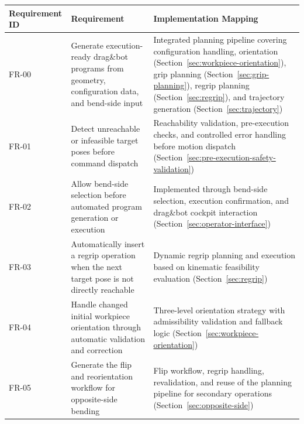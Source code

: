 ﻿\begin{landscape}

\begin{table}[p]
\centering
\normalsize
\setlength{\tabcolsep}{3pt}
\renewcommand{\arraystretch}{1.08}

\begin{tabular}{
L{3.0cm}
L{6.8cm}
L{12.2cm}
}
\hline
\textbf{Requirement ID} &
\textbf{Requirement} &
\textbf{Implementation Mapping} \\
\hline

FR-00 & Generate execution-ready drag\&bot programs from geometry, configuration data, and bend-side input &
Integrated planning pipeline covering configuration handling, orientation (Section~\ref{sec:workpiece-orientation}), grip planning (Section~\ref{sec:grip-planning}), regrip planning (Section~\ref{sec:regrip}), and trajectory generation (Section~\ref{sec:trajectory}) \\
\hline

FR-01 & Detect unreachable or infeasible target poses before command dispatch &
Reachability validation, pre-execution checks, and controlled error handling before motion dispatch (Section~\ref{sec:pre-execution-safety-validation}) \\
\hline

FR-02 & Allow bend-side selection before automated program generation or execution &
Implemented through bend-side selection, execution confirmation, and drag\&bot cockpit interaction (Section~\ref{sec:operator-interface}) \\
\hline

FR-03 & Automatically insert a regrip operation when the next target pose is not directly reachable &
Dynamic regrip planning and execution based on kinematic feasibility evaluation (Section~\ref{sec:regrip}) \\
\hline

FR-04 & Handle changed initial workpiece orientation through automatic validation and correction &
Three-level orientation strategy with admissibility validation and fallback logic (Section~\ref{sec:workpiece-orientation}) \\
\hline

FR-05 & Generate the flip and reorientation workflow for opposite-side bending &
Flip workflow, regrip handling, revalidation, and reuse of the planning pipeline for secondary operations (Section~\ref{sec:opposite-side}) \\
\hline


\end{tabular}
\end{table}
\end{landscape}
